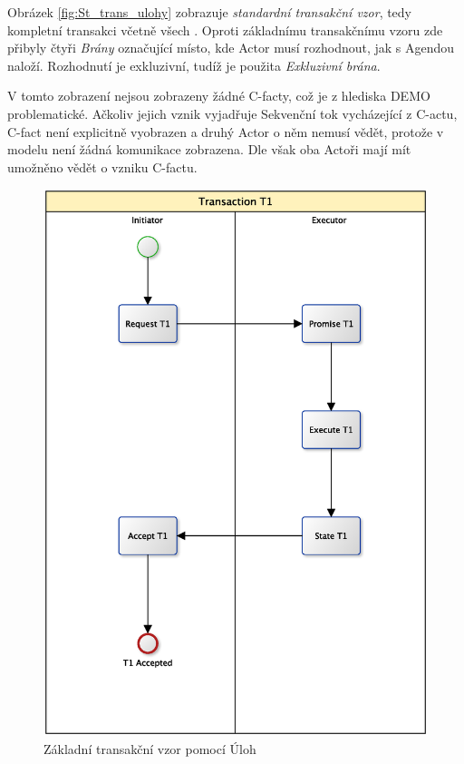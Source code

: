 \documentclass[]{article}
\begin{document}
Obrázek \ref{fig:St_trans_ulohy} zobrazuje \textit{standardní transakční vzor}, tedy kompletní transakci včetně všech . Oproti základnímu transakčnímu vzoru zde přibyly čtyři \textit{Brány} označující místo, kde Actor musí rozhodnout, jak s Agendou naloží. Rozhodnutí je exkluzivní, tudíž je použita \textit{Exkluzivní brána}.

V tomto zobrazení nejsou zobrazeny žádné C-facty, což je z hlediska DEMO problematické. Ačkoliv jejich vznik vyjadřuje Sekvenční tok vycházející z C-actu, C-fact není explicitně vyobrazen a druhý Actor o něm nemusí vědět, protože v modelu není žádná komunikace zobrazena. Dle \cite{Dietz2006} však oba Actoři mají mít umožněno vědět o vzniku C-factu.

\begin{figure}[H]\centering
\includegraphics[width=1.0\textwidth]{obrazky/transaction-basic-tasks}
\caption{Základní transakční vzor pomocí Úloh}
\label{fig:Zk_trans_ulohy}
\end{figure}
\end{document}

